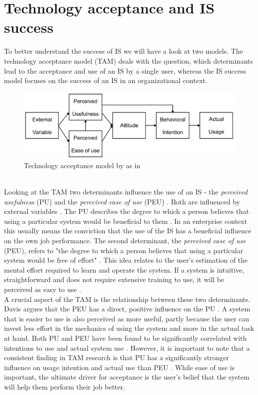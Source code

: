 \documentclass[
	english,
	ruledheaders=section,%
	class=report,%
	thesis={type=bachelor},%
	accentcolor=1b,%
	custommargins=true,%
	marginpar=false,%
	parskip=half-,%
	fontsize=11pt,%
	DIV=14,
]{tudapub}
\begin{document}
\section{Technology acceptance and IS success}
To better understand the success of IS we will have a look at two models. The technology acceptance model (TAM) \parencite{Davis1989} deals with the question, which determinants lead to the acceptance and use of an IS by a single user, whereas the IS success model \parencite{DeloneMcLean2003ISSuccessTenYearUpdate} focuses on the success of an IS in an organizational context.
\begin{figure}[h!]
    \includegraphics[width=1\linewidth]{images/TAM.png}
    \caption{Technology acceptance model by \parencite{Davis1989} as in \parencite[p.~1589]{Huimin}}
    \label{fig:enter-label}
\end{figure}
\\
Looking at the TAM two determinants influence the use of an IS - the \textit{perceived usefulness} (PU) and the \textit{perceived ease of use} (PEU) \parencite[p.~320]{Davis1989}. Both are influenced by external variables \parencite[p.~335]{Davis1989}. The PU describes the degree to which a person believes that using a particular system would be beneficial to them \parencite[p.~320]{Davis1989}. In an enterprise context this usually means the conviction that the use of the IS has a beneficial influence on the own job performance. The second determinant, the \textit{perceived ease of use} (PEU), refers to "the degree to which a person believes that using a particular system would be free of effort" \parencite[p.~320]{Davis1989}. This idea relates to the user's estimation of the mental effort required to learn and operate the system. If a system is intuitive, straightforward and does not require extensive training to use, it will be perceived as easy to use \parencite[p.~324-325]{Davis1989}.\\
A crucial aspect of the TAM is the relationship between these two determinants. Davis argues that the PEU has a direct, positive influence on the PU \parencite[p.~334]{Davis1989}. A system that is easier to use is also perceived as more useful, partly because the user can invest less effort in the mechanics of using the system and more in the actual task at hand. Both PU and PEU have been found to be significantly correlated with intentions to use and actual system use \parencite[p.~333]{Davis1989}. However, it is important to note that a consistent finding in TAM research is that PU has a significantly stronger influence on usage intention and actual use than PEU \parencite[p.~333]{Davis1989}. While ease of use is important, the ultimate driver for acceptance is the user's belief that the system will help them perform their job better.\\
\end{document}
